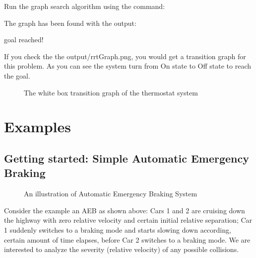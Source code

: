 \documentclass[letterpaper,10pt,english]{sphinxmanual}
\begin{document}
Run the graph search algorithm using the command:

\begin{sphinxVerbatim}[commandchars=\\\{\}]
  
\end{sphinxVerbatim}

The graph has been found with the output:

\begin{sphinxVerbatim}[commandchars=\\\{\}]
goal reached!
\end{sphinxVerbatim}

If you check the the output/rrtGraph.png, you would get a transition graph for this problem. As you can see the system turn from On state to Off state to reach the goal.
\begin{figure}[htbp]
\centering
\capstart

\noindent{}
\caption{The white box transition graph of the thermostat system}\label{\detokenize{dryvr's_control_synthesis:id1}}\end{figure}


\chapter{Examples}
\label{\detokenize{example::doc}}\label{\detokenize{example:examples}}\label{\detokenize{example:example-label}}

\section{Getting started: Simple Automatic Emergency Braking}
\label{\detokenize{example:getting-started-simple-automatic-emergency-braking}}\begin{figure}[htbp]
\centering
\capstart

\noindent{}
\caption{An illustration of Automatic Emergency Braking System}\label{\detokenize{example:id1}}\end{figure}

Consider the example an AEB as shown above:
Cars 1 and 2 are cruising down the highway with zero relative velocity and certain initial relative separation;  Car 1 suddenly switches to a braking mode and starts slowing down according, certain amount of time elapses,  before Car 2 switches to a braking mode. We are interested to analyze the severity (relative velocity) of any possible collisions.
\end{document}
